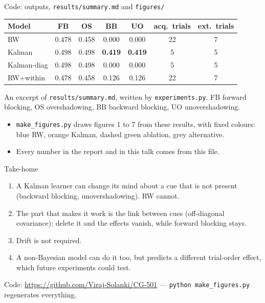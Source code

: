 \documentclass[aspectratio=169,11pt]{beamer}
\begin{document}
\begin{frame}{Code: outputs, \texttt{results/summary.md} and \texttt{figures/}}
\centering
\footnotesize
\begin{tabular}{lcccccc}
\toprule
Model & FB & OS & BB & UO & acq.\ trials & ext.\ trials\\
\midrule
\textcolor{rw}{RW} & 0.478 & 0.458 & 0.000 & 0.000 & 22 & 7\\
\textcolor{kal}{Kalman} & 0.498 & 0.498 & \textbf{0.419} & \textbf{0.419} & 5 & 5\\
\textcolor{dia}{Kalman-diag} & 0.498 & 0.498 & 0.000 & 0.000 & 5 & 5\\
RW+within & 0.478 & 0.458 & 0.126 & 0.126 & 22 & 7\\
\bottomrule
\end{tabular}

\vspace{0.3em}
{\scriptsize An excerpt of \texttt{results/summary.md}, written by \texttt{experiments.py}. FB forward blocking, OS overshadowing, BB backward blocking, UO unovershadowing.}

\vspace{0.6em}
\raggedright
\begin{itemize}\small
\item \texttt{make\_figures.py} draws figures 1 to 7 from these results, with fixed colours:
\textcolor{rw}{blue RW}, \textcolor{kal}{orange Kalman}, \textcolor{dia}{dashed green ablation}, grey alternative.
\item Every number in the report and in this talk comes from this file.
\end{itemize}
\end{frame}

\begin{frame}{Take-home}
\begin{enumerate}
\item A Kalman learner can change its mind about a cue that is not present (backward blocking, unovershadowing). RW cannot.
\item The part that makes it work is the \alert{link between cues} (off-diagonal covariance): delete it and the effects vanish, while forward blocking stays.
\item \alert{Drift is not required}.
\item A non-Bayesian model can do it too, but predicts a different trial-order effect, which future experiments could test.
\end{enumerate}
\vspace{0.6em}
\small Code: \url{https://github.com/Viraj-Solanki/CG-501} \quad --- \quad \texttt{python make\_figures.py} regenerates everything.
\end{frame}
\end{document}
